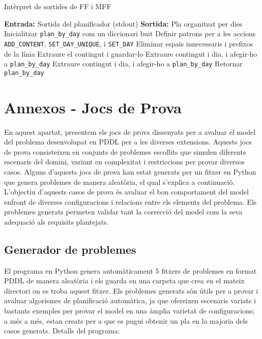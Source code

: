 \documentclass[a4paper]{article}
\begin{document}
	\begin{algorithm}[H]
		\caption{Intèrpret de sortides de FF i MFF}\label{alg:ffinterpreter}
		\begin{algorithmic}[1]
			\State \textbf{Entrada:} Sortida del planificador (stdout)
			\State \textbf{Sortida:} Pla organitzat per dies
			\State Inicialitzar \texttt{plan\_by\_day} com un diccionari buit
			\State Definir patrons per a les accions \texttt{ADD\_CONTENT}, \texttt{SET\_DAY\_UNIQUE}, i \texttt{SET\_DAY}
			\State Eliminar espais innecessaris i prefixos de la línia
			\State Extraure el contingut i guardar-lo
			\State Extraure contingut i dia, i afegir-ho a \texttt{plan\_by\_day}
			\State Extraure contingut i dia, i afegir-ho a \texttt{plan\_by\_day}
			\EndIf
			\EndFor
			\State Retornar \texttt{plan\_by\_day}
		\end{algorithmic}
	\end{algorithm}
	
	\newpage
	\section{Annexos - Jocs de Prova}
	
	En aquest apartat, presentem els jocs de prova dissenyats per a avaluar el model del problema desenvolupat en PDDL per a les diverses extensions. Aquests jocs de prova consisteixen en conjunts de problemes escollits que simulen diferents escenaris del domini, variant en complexitat i restriccions per provar diversos casos. Alguns d'aquests jocs de prova han estat generats per un fitxer en Python que genera problemes de manera aleatòria, el qual s'explica a continuació. L'objectiu d'aquests casos de prova és avaluar el bon comportament del model enfront de diverses configuracions i relacions entre els elements del problema. Els problemes generats permeten validar tant la correcció del model com la seva adequació als requisits plantejats. 
	
	
	
	\subsection{Generador de problemes}	
	
	El programa en Python genera automàticament 5 fitxers de problemes en format PDDL de manera aleatòria i els guarda en una carpeta que crea en el mateix directori on es troba aquest fitxer. Els problemes generats són útils per a provar i avaluar algorismes de planificació automàtica, ja que ofereixen escenaris variats i bastants exemples per provar el model  en una àmplia varietat de configuracions; a més a més, estan creats per a que es pugui obtenir un pla en la majoria dels casos generats. 
	Detalls del programa: \\
	
\end{document}
